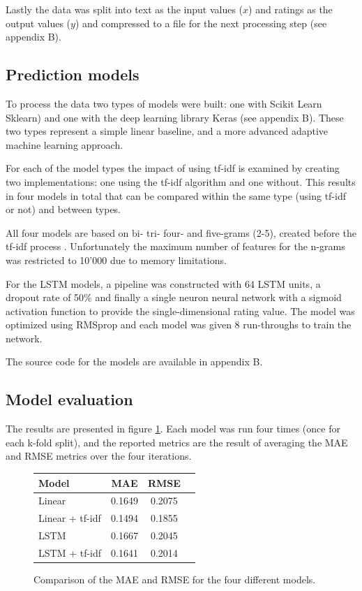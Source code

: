 \documentclass[a4paper]{article}
\begin{document}
Lastly the data was split into text as the input values ($x$) and ratings
as the output values ($y$) and compressed to a file for the next processing
step (see appendix B).

\subsection{Prediction models}
To process the data two types of models were built: one with Scikit Learn
Sklearn) and one with the deep learning library Keras (see appendix B).
These two types represent a simple linear baseline, and a more advanced
adaptive machine learning approach.

For each of the model types the impact of using tf-idf is examined by creating
two implementations: one using the tf-idf algorithm and one without. This
results in four models in total that can be compared within the same type
(using tf-idf or not) and between types.

All four models are based on bi- tri- four- and five-grams (2-5),
created before the tf-idf process \cite{Jurafsky2000}. Unfortunately the
maximum number of features for the n-grams was restricted to 10'000 due to
memory limitations.

For the LSTM models, a pipeline was constructed with 64 LSTM units, a dropout
rate of 50\% and finally a single neuron neural network with a sigmoid
activation function to provide the single-dimensional rating value. The
model was optimized using RMSprop and each model was given 8 run-throughs to
train the network.

The source code for the models are available in appendix B.

\subsection{Model evaluation}
The results are presented in figure \ref{fig:results}.
Each model was run four times (once for each k-fold split), and
the reported metrics are the result of averaging the MAE and RMSE metrics over
the four iterations.

\begin{figure}
  \begin{centering}
    \begin{tabular}{ l c c c }
      \textbf{Model} & \textbf{MAE} & \textbf{RMSE} \\ \hline
      Linear          & 0.1649 & 0.2075 \\
      Linear + tf-idf & 0.1494 & 0.1855 \\
      LSTM            & 0.1667 & 0.2045 \\
      LSTM + tf-idf   & 0.1641 & 0.2014
    \end{tabular}
    \caption{Comparison of the MAE and RMSE for the four different models.}
    \label{fig:results}
  \end{centering}
\end{figure}
\end{document}
